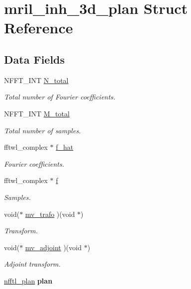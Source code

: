 \hypertarget{structmril__inh__3d__plan}{\section{mril\-\_\-inh\-\_\-3d\-\_\-plan Struct Reference}
\label{structmril__inh__3d__plan}
}
\subsection*{Data Fields}
\begin{DoxyCompactItemize}
\item 
N\-F\-F\-T\-\_\-\-I\-N\-T \hyperlink{structmril__inh__3d__plan_a4dc3583cf7f316db903b3ae7c68beb46}{N\-\_\-total}
\begin{DoxyCompactList}\small\item\em Total number of Fourier coefficients. \end{DoxyCompactList}\item 
N\-F\-F\-T\-\_\-\-I\-N\-T \hyperlink{structmril__inh__3d__plan_a0b00c9217e0f3c700963e3bd54ea6f9e}{M\-\_\-total}
\begin{DoxyCompactList}\small\item\em Total number of samples. \end{DoxyCompactList}\item 
fftwl\-\_\-complex $\ast$ \hyperlink{structmril__inh__3d__plan_ae1f94471fa54c0a172ede3345d0a9a9c}{f\-\_\-hat}
\begin{DoxyCompactList}\small\item\em Fourier coefficients. \end{DoxyCompactList}\item 
fftwl\-\_\-complex $\ast$ \hyperlink{structmril__inh__3d__plan_adb03497106fd0a995b70010f9cd9684b}{f}
\begin{DoxyCompactList}\small\item\em Samples. \end{DoxyCompactList}\item 
void($\ast$ \hyperlink{structmril__inh__3d__plan_a61eec020c68a2b36cff4acb6dd4dcf96}{mv\-\_\-trafo} )(void $\ast$)
\begin{DoxyCompactList}\small\item\em Transform. \end{DoxyCompactList}\item 
void($\ast$ \hyperlink{structmril__inh__3d__plan_a2d189c2b7f8b5bf635cce01354ef253e}{mv\-\_\-adjoint} )(void $\ast$)
\begin{DoxyCompactList}\small\item\em Adjoint transform. \end{DoxyCompactList}\item 
\hypertarget{structmril__inh__3d__plan_a0e1db4b2be63bb1fffc9342986cfdc09}{\hyperlink{structnfftl__plan}{nfftl\-\_\-plan} {\bfseries plan}}\label{structmril__inh__3d__plan_a0e1db4b2be63bb1fffc9342986cfdc09}


\end{DoxyCompactItemize}
